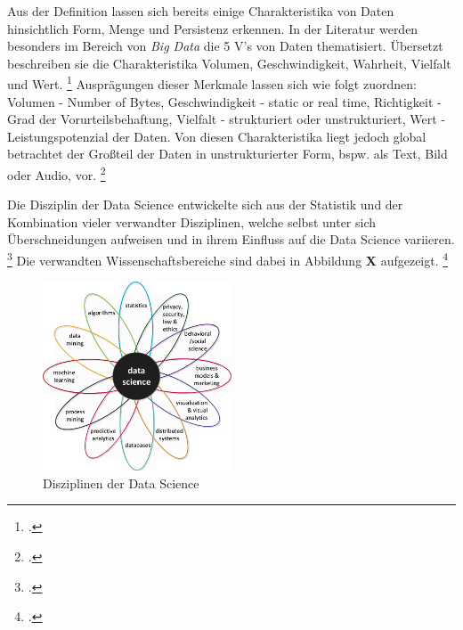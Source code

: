 Aus der Definition lassen sich bereits einige Charakteristika von Daten hinsichtlich Form, Menge und Persistenz erkennen.
In der Literatur werden besonders im Bereich von \textit{Big Data} die 5 V's von Daten thematisiert.
Übersetzt beschreiben sie die Charakteristika Volumen, Geschwindigkeit, Wahrheit, Vielfalt und Wert. \footcite[prenote][postnote]{Big data is always}
Ausprägungen dieser Merkmale lassen sich wie folgt zuordnen: Volumen - Number of Bytes, Geschwindigkeit - static or real time, Richtigkeit - Grad der Vorurteilsbehaftung, Vielfalt - strukturiert oder unstrukturiert, Wert - Leistungspotenzial der Daten.
Von diesen Charakteristika liegt jedoch global betrachtet der Großteil der Daten in unstrukturierter Form, bspw. als Text, Bild oder Audio, vor. \footcite[prenote][postnote]{most of the data}

Die Disziplin der Data Science entwickelte sich aus der Statistik und der Kombination vieler verwandter Disziplinen, welche selbst unter sich Überschneidungen aufweisen und in ihrem Einfluss auf die Data Science variieren. \footcite[prenote][postnote]{disciplines of data science}
Die verwandten Wissenschaftsbereiche sind dabei in Abbildung \textbf{X} aufgezeigt. \footcite[prenote][postnote]{disciplines of data science}

\begin{figure}[htb]
    \centering
    \includegraphics[width=0.5\textwidth]{graphics/ds_disciplines.png}
    \caption{Disziplinen der Data Science}
    \label{fig:data science disciplines}
\end{figure}

